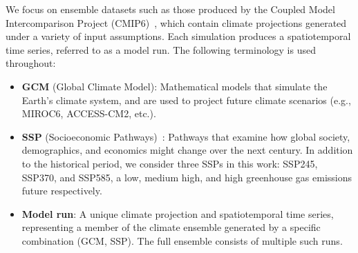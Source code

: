 We focus on ensemble datasets such as those produced by the Coupled Model Intercomparison Project (CMIP6)~\cite{eyring2016overview}, which contain climate projections generated under a variety of input assumptions. Each simulation produces a spatiotemporal time series, referred to as a model run. The following terminology is used throughout:
\begin{itemize}[noitemsep, topsep=0pt]
    \item \textbf{GCM} (Global Climate Model): Mathematical models that simulate the Earth's climate system, and are used to project future climate scenarios (e.g., MIROC6, ACCESS-CM2, etc.).
    \item \textbf{SSP} (Socioeconomic Pathways)~\cite{riahi2017shared}: Pathways that examine how global society, demographics, and economics might change over the next century. 
    In addition to the historical period, we consider three SSPs in this work: SSP245, SSP370, and SSP585, a low, medium high, and high greenhouse gas emissions future respectively. 
    \item \textbf{Model run}: A unique climate projection and spatiotemporal time series, representing a member of the climate ensemble generated by a specific combination (GCM, SSP). The full ensemble consists of multiple such runs.
\end{itemize}


